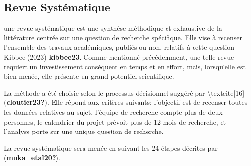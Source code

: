 \documentclass[
  letterpaper,
]{scrbook}
\begin{document}
\hypertarget{revue-systuxe9matique}{%
\subsection{Revue Systématique}\label{revue-systuxe9matique}}

une revue systématique est une synthèse méthodique et exhaustive de la
littérature centrée sur une question de recherche spécifique. Elle vise
à recenser l'ensemble des travaux académiques, publiés ou non, relatifs
à cette question Kibbee (2023) \textbf{kibbee23}. Comme mentionné
précédemment, une telle revue requiert un investissement conséquent en
temps et en effort, mais, lorsqu'elle est bien menée, elle présente un
grand potentiel scientifique.

La méthode a été choisie selon le processus décisionnel suggéré par
\textbackslash textcite{[}16{]} (\textbf{cloutier23?}). Elle répond aux
critères suivants: l'objectif est de recenser toutes les données
relatives au sujet, l'équipe de recherche compte plus de deux personnes,
le calendrier du projet prévoit plus de 12 mois de recherche, et
l'analyse porte sur une unique question de recherche.

La revue systématique sera menée en suivant les 24 étapes décrites par
(\textbf{muka\_etal20?}).
\end{document}
